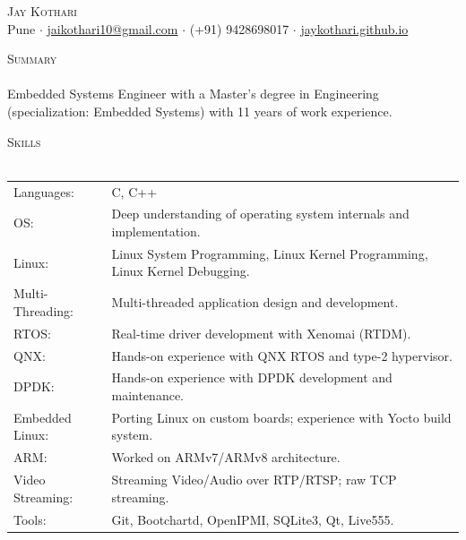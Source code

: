 \documentclass[a4paper]{article}
\newcommand{\lineunder} {
    \vspace*{-8pt} \\
    \hspace*{-18pt} \hrulefill \\
}
\newcommand{\header} [1] {
    {\hspace*{-18pt}\vspace*{6pt} \textsc{#1}}
    \vspace*{-6pt} \lineunder
}
\begin{document}
\vspace*{-40pt}



\vspace*{-10pt}
\begin{center}
	{\Huge \scshape {Jay Kothari}}\\
	\vspace{2pt}
	Pune $\cdot$ \href{mailto:jaikothari10@gmail.com}{jaikothari10@gmail.com} $\cdot$ (+91) 9428698017 $\cdot$ \href{https://jaykothari.github.io/}{jaykothari.github.io}\\
\end{center}

\header{Summary}
\vspace{1mm}
Embedded Systems Engineer with a Master's degree in Engineering (specialization: Embedded Systems) with 11 years of work experience.
\vspace{2mm}

\header{Skills}
\begin{tabular}{ l l }
	Languages:       & C, C++                                                                             \\
	OS:              & Deep understanding of operating system internals and implementation.               \\
	Linux:           & Linux System Programming, Linux Kernel Programming, Linux Kernel Debugging.        \\
	Multi-Threading: & Multi-threaded application design and development.                                 \\
	RTOS:            & Real-time driver development with Xenomai (RTDM).                                  \\
	QNX:			  & Hands-on experience with QNX RTOS and type-2 hypervisor.						 \\
	DPDK:            & Hands-on experience with DPDK development and maintenance.                         \\
	Embedded Linux:  & Porting Linux on custom boards; experience with Yocto build system.                \\
	ARM:             & Worked on ARMv7/ARMv8 architecture.                                                \\
	Video Streaming: & Streaming Video/Audio over RTP/RTSP; raw TCP streaming.                            \\
	Tools:           & Git, Bootchartd, OpenIPMI, SQLite3, Qt, Live555.                                   \\
\end{tabular}
\vspace{2mm}
\end{document}
